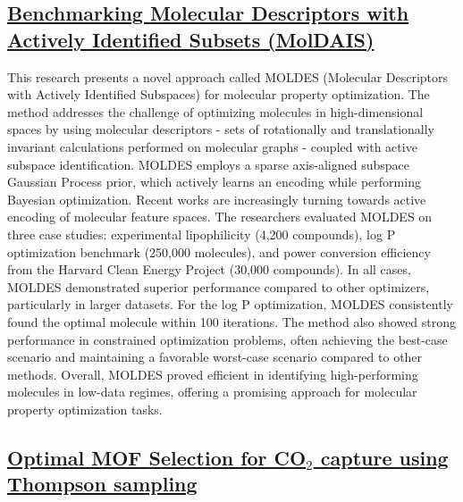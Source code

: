  \subsection*{\href{https://www.youtube.com/watch?v=uYXAe3sRUSo}{Benchmarking Molecular Descriptors with Actively Identified Subsets (MolDAIS)}}

This research presents a novel approach called MOLDES (Molecular Descriptors with Actively Identified Subspaces) for molecular property optimization. The method addresses the challenge of optimizing molecules in high-dimensional spaces by using molecular descriptors - sets of rotationally and translationally invariant calculations performed on molecular graphs - coupled with active subspace identification. MOLDES employs a sparse axis-aligned subspace Gaussian Process prior, which actively learns an encoding while performing Bayesian optimization. Recent works\cite{sorourifar_accelerating_2024,maus_local_2023} are increasingly turning towards active encoding of molecular feature spaces. The researchers evaluated MOLDES on three case studies: experimental lipophilicity (4,200 compounds), log P optimization benchmark (250,000 molecules), and power conversion efficiency from the Harvard Clean Energy Project (30,000 compounds). In all cases, MOLDES demonstrated superior performance compared to other optimizers, particularly in larger datasets. For the log P optimization, MOLDES consistently found the optimal molecule within 100 iterations. The method also showed strong performance in constrained optimization problems, often achieving the best-case scenario and maintaining a favorable worst-case scenario compared to other methods. Overall, MOLDES proved efficient in identifying high-performing molecules in low-data regimes, offering a promising approach for molecular property optimization tasks.
 \subsection*{\href{https://youtu.be/l0aVZDMwIMU}{Optimal MOF Selection for CO$_2$ capture using Thompson sampling}}

